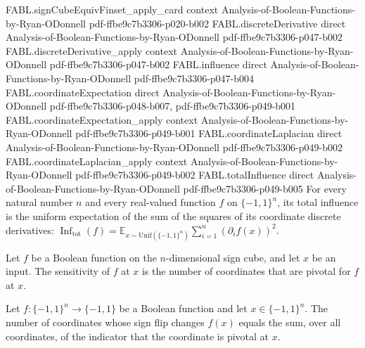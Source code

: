 \begin{theorem}
\proofstep
  {FABL.signCubeEquivFinset_apply_card}
  {context}
  {Analysis-of-Boolean-Functions-by-Ryan-ODonnell}
  {pdf-ffbe9c7b3306-p020-b002}
\proofstep
  {FABL.discreteDerivative}
  {direct}
  {Analysis-of-Boolean-Functions-by-Ryan-ODonnell}
  {pdf-ffbe9c7b3306-p047-b002}
\proofstep
  {FABL.discreteDerivative_apply}
  {context}
  {Analysis-of-Boolean-Functions-by-Ryan-ODonnell}
  {pdf-ffbe9c7b3306-p047-b002}
\proofstep
  {FABL.influence}
  {direct}
  {Analysis-of-Boolean-Functions-by-Ryan-ODonnell}
  {pdf-ffbe9c7b3306-p047-b004}
\proofstep
  {FABL.coordinateExpectation}
  {direct}
  {Analysis-of-Boolean-Functions-by-Ryan-ODonnell}
  {pdf-ffbe9c7b3306-p048-b007,
    pdf-ffbe9c7b3306-p049-b001}
\proofstep
  {FABL.coordinateExpectation_apply}
  {context}
  {Analysis-of-Boolean-Functions-by-Ryan-ODonnell}
  {pdf-ffbe9c7b3306-p049-b001}
\proofstep
  {FABL.coordinateLaplacian}
  {direct}
  {Analysis-of-Boolean-Functions-by-Ryan-ODonnell}
  {pdf-ffbe9c7b3306-p049-b002}
\proofstep
  {FABL.coordinateLaplacian_apply}
  {context}
  {Analysis-of-Boolean-Functions-by-Ryan-ODonnell}
  {pdf-ffbe9c7b3306-p049-b002}
\proofstep
  {FABL.totalInfluence}
  {direct}
  {Analysis-of-Boolean-Functions-by-Ryan-ODonnell}
  {pdf-ffbe9c7b3306-p049-b005}
For every natural number $n$ and every real-valued function $f$ on $\{-1,1\}^n$, its
total influence is the uniform expectation of the sum of the squares of its coordinate
discrete derivatives:
$\operatorname{Inf}_{\mathrm{tot}}(f)=\mathbb{E}_{x\sim\mathrm{Unif}(\{-1,1\}^n)}\sum_{i=1}^n
(\partial_i f(x))^2$.
\end{theorem}

\begin{definition}
\label{FABL.sensitivity}
\leanok
{}
Let $f$ be a Boolean function on the $n$-dimensional sign cube, and let $x$ be an input.
The sensitivity of $f$ at $x$ is the number of coordinates that are pivotal for $f$ at
$x$.
\end{definition}

\begin{theorem}
\label{FABL.sensitivity_cast_eq_sum_pivotalIndicator}
\leanok
{}
Let $f:\{-1,1\}^n\to\{-1,1\}$ be a Boolean function and let $x\in\{-1,1\}^n$. The number
of coordinates whose sign flip changes $f(x)$ equals the sum, over all coordinates, of
the indicator that the coordinate is pivotal at $x$.
\end{theorem}


